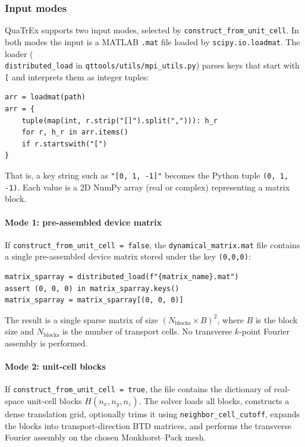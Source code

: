 \subsubsection{Input modes}
\label{sec:input_modes}

QuaTrEx supports two input modes, selected by
\texttt{construct\_from\_unit\_cell}.  In both modes the input is a
MATLAB \texttt{.mat} file loaded by \texttt{scipy.io.loadmat}.  The
loader (\\\texttt{distributed\_load} in
\texttt{qttools/utils/mpi\_utils.py}) parses keys that start with
\texttt{[} and interprets them as integer tuples:
\begin{lstlisting}
arr = loadmat(path)
arr = {
    tuple(map(int, r.strip("[]").split(","))): h_r
    for r, h_r in arr.items()
    if r.startswith("[")
}
\end{lstlisting}
That is, a key string such as \texttt{"[0, 1, -1]"} becomes the Python
tuple \texttt{(0, 1, -1)}.  Each value is a 2D NumPy array (real or
complex) representing a matrix block.

\paragraph{Mode 1: pre-assembled device matrix}
If \texttt{construct\_from\_unit\_cell = false}, the
\texttt{dynamical\_matrix.mat} file contains a single pre-assembled
device matrix stored under the key \texttt{(0,0,0)}:
\begin{lstlisting}
matrix_sparray = distributed_load(f"{matrix_name}.mat")
assert (0, 0, 0) in matrix_sparray.keys()
matrix_sparray = matrix_sparray[(0, 0, 0)]
\end{lstlisting}
The result is a single sparse matrix of size
$(N_\mathrm{blocks}\times B)^2$, where $B$ is the block size and
$N_\mathrm{blocks}$ is the number of transport cells.  No transverse
$k$-point Fourier assembly is performed.

\paragraph{Mode 2: unit-cell blocks}
If \texttt{construct\_from\_unit\_cell = true}, the file contains the
dictionary of real-space unit-cell blocks
$H(n_x,n_y,n_z)$.  The solver loads all blocks, constructs a dense
translation grid, optionally trims it using
\texttt{neighbor\_cell\_cutoff}, expands the blocks into
transport-direction BTD matrices, and performs the transverse
Fourier assembly on the chosen Monkhorst--Pack mesh.

